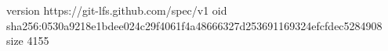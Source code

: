 version https://git-lfs.github.com/spec/v1
oid sha256:0530a9218e1bdee024c29f4061f4a48666327d253691169324efcfdec5284908
size 4155

